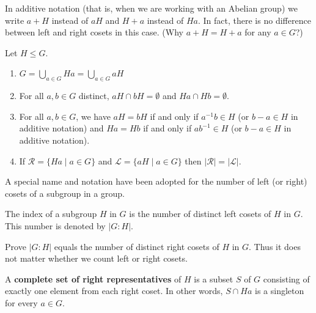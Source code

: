 \documentclass[11pt,a4paper]{article}
\begin{document}
\begin{rem}
    In additive notation (that is, when we are working with an Abelian group) we write \(a+H\) instead of \(aH\) and \(H+a\) instead of \(Ha\).
    In fact, there is no difference between left and right cosets in this case. (Why \(a+ H = H + a\) for any \(a\in G\)?)
\end{rem}
 



\begin{cor}\label{cor.hungerford.cor4.3}
Let \(H\leq G\).
\begin{enumerate}[label=(\roman*)]
    \item      \( G = \bigcup\limits_{a \in G} Ha = \bigcup\limits_{a \in G} aH \)
    \item For all \(a,b\in G\) distinct, \( aH \cap bH = \emptyset \) and \( Ha \cap Hb = \emptyset \).
    \item For all \(a,b\in G\), we have \( aH = bH \) if and only if \( a^{-1}b \in H \) (or \( b-a \in H \) in additive notation)  and \( Ha = Hb \) if and only if \( ab^{-1} \in H \) (or \( b-a  \in H \) in additive notation).
    \item If \( \mathcal{R} = \{ Ha \mid a \in G \} \) and \( \mathcal{L} = \{ aH \mid a \in G \} \) then \(|\mathcal{R}|=|\mathcal{L}|\).
\end{enumerate}
 
\end{cor}

A special name and notation have been adopted for the number of left (or right) cosets of a subgroup in a group.

\begin{defi}[Index]
    The index of a subgroup $H$ in $G$ is the number of distinct left cosets of $H$ in $G$. This number is denoted by $|G: H|$. 
\end{defi}

\begin{eje}
    Prove $|G: H|$ equals the number of distinct right cosets of $H$ in $G$.
    Thus it does not matter whether we count left or right cosets.
\end{eje}


\begin{defi}
    A \textbf{complete set of right representatives} of \(H\) is a subset \(S\) of \(G\) consisting of exactly one element from each right coset. In other words, 
    \(S\cap Ha \) is a singleton for every \(a\in G\).
\end{defi}
\end{document}
